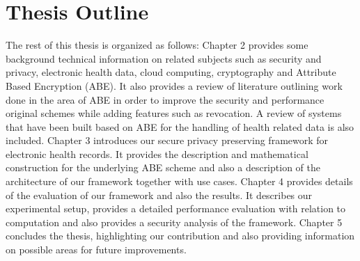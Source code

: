 \section{Thesis Outline}

The rest of this thesis is organized as follows: Chapter 2 provides some background technical information on related subjects such as security and privacy, electronic health data, cloud computing, cryptography and Attribute Based Encryption (ABE). It also provides a review of literature outlining work done in the area of ABE in order to improve the security and performance original schemes while adding features such as revocation. A review of systems that have been built based on ABE for the handling of health related data is also included. Chapter 3 introduces our secure privacy preserving framework for electronic health records. It provides the description and mathematical construction for the underlying ABE scheme and also a description of the architecture of our framework together with use cases. Chapter 4 provides details of the evaluation of our framework and also the results. It describes our experimental setup, provides a detailed performance evaluation with relation to computation and also provides a security analysis of the framework. Chapter 5 concludes the thesis, highlighting our contribution and also providing information on possible areas for future improvements.